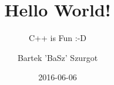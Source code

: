 \title{Hello World!}
\subtitle{C++ is Fun :-D}

\author[BaSz]{Bartek 'BaSz' Szurgot}

\date{2016-06-06}

